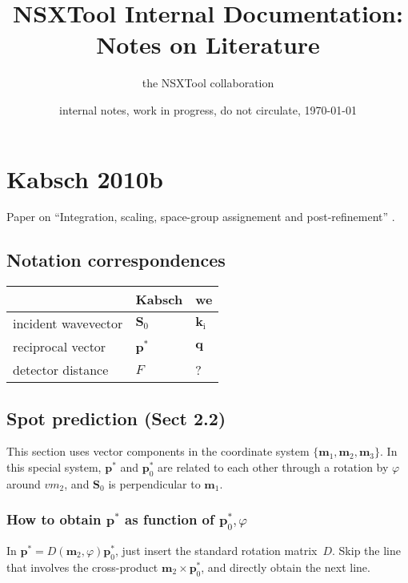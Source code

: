 \documentclass[twocolumn,preprintnumbers,amsmath,amssymb]{revtex4}
\def\v#1{\mathbf{#1}}
\begin{document}
\title{NSXTool Internal Documentation: Notes on Literature}
\author{the NSXTool collaboration}

\date{internal notes, work in progress, do not circulate, \today}


\maketitle

\section{Kabsch 2010b}

Paper on ``Integration, scaling, space-group assignement and post-refinement'' \cite{Kab10b}.

\subsection{Notation correspondences}

\begin{tabular}{lll}
&Kabsch &we\\\hline
incident wavevector &$\v{S}_0$ &$\v{k}_\text{i}$\\
reciprocal vector &$\v{p^*}$ &$\v{q}$\\
detector distance &$F$ &?\\
\end{tabular}

\subsection{Spot prediction (Sect 2.2)}

This section uses vector components in the coordinate system $\{\v{m}_1,\v{m}_2,\v{m}_3\}$.
In this special system,
$\v{p}^*$ and $\v{p}^*_0$ are related to each other
through a rotation by $\varphi$ around $v{m}_2$,
and $\v{S}_0$ is perpendicular to $\v{m}_1$.

\subsubsection{How to obtain $\v{p}^*$ as function of $\v{p}^*_0,\varphi$}

In $\v{p}^*=D(\v{m}_2,\varphi)\v{p}^*_0$, just insert the standard rotation matrix~$D$.
Skip the line that involves the cross-product $\v{m}_2\times\v{p}^*_0$,
and directly obtain the next line.
\end{document}
